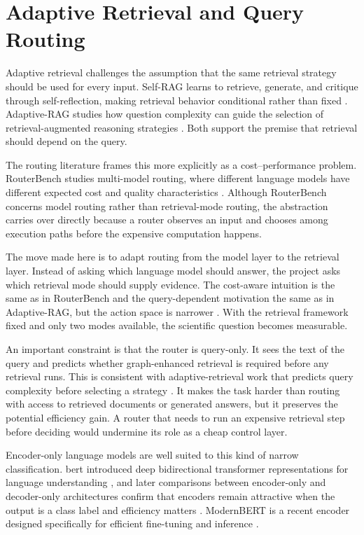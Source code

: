\documentclass[english, bibtex]{kththesis}               %
\numberwithin{listing}{chapter}
\begin{document}
\section{Adaptive Retrieval and Query Routing}
\label{sec:backgroundAdaptiveRetrieval}

Adaptive retrieval challenges the assumption that the same retrieval strategy should be used for every input. Self-RAG learns to retrieve, generate, and critique through self-reflection, making retrieval behavior conditional rather than fixed \cite{asai2023selfrag}. Adaptive-RAG studies how question complexity can guide the selection of retrieval-augmented reasoning strategies \cite{jeong2024adaptiverag}. Both support the premise that retrieval should depend on the query.

The routing literature frames this more explicitly as a cost--performance problem. RouterBench studies multi-model routing, where different language models have different expected cost and quality characteristics \cite{hu2024routerbench}. Although RouterBench concerns model routing rather than retrieval-mode routing, the abstraction carries over directly because a router observes an input and chooses among execution paths before the expensive computation happens.

The move made here is to adapt routing from the model layer to the retrieval layer. Instead of asking which language model should answer, the project asks which retrieval mode should supply evidence. The cost-aware intuition is the same as in RouterBench and the query-dependent motivation the same as in Adaptive-RAG, but the action space is narrower \cite{hu2024routerbench,jeong2024adaptiverag}. With the retrieval framework fixed and only two modes available, the scientific question becomes measurable.

An important constraint is that the router is query-only. It sees the text of the query and predicts whether graph-enhanced retrieval is required before any retrieval runs. This is consistent with adaptive-retrieval work that predicts query complexity before selecting a strategy \cite{jeong2024adaptiverag,hu2024routerbench}. It makes the task harder than routing with access to retrieved documents or generated answers, but it preserves the potential efficiency gain. A router that needs to run an expensive retrieval step before deciding would undermine its role as a cheap control layer.

Encoder-only language models are well suited to this kind of narrow classification. \Gls{bert} introduced deep bidirectional transformer representations for language understanding \cite{devlin2019bert}, and later comparisons between encoder-only and decoder-only architectures confirm that encoders remain attractive when the output is a class label and efficiency matters \cite{benayas2024encoder}. ModernBERT is a recent encoder designed specifically for efficient fine-tuning and inference \cite{warner2024modernbert}.
\end{document}
